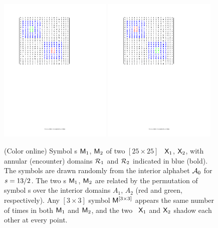 \documentclass[12pt]{iopart}
\begin{document}
\begin{figure}
\begin{center}
 \includegraphics[width=0.48\textwidth]{AKSs13TwoBlocksM1}
 \includegraphics[width=0.48\textwidth]{AKSs13TwoBlocksM2}
\end{center}
\caption[]{\label{fig:AKSs13TwoBlock}
(Color online)
Symbol \brick s $\mathsf{M}_1$, $\mathsf{M}_2$ of two $[25\times25]$ \twots\ $\mathsf{X}_1$,
$\mathsf{X}_2$, with
annular
(encounter) domains $\mathcal{R}_1$ and $\mathcal{R}_2$ indicated
in blue (bold).
The symbols are drawn randomly from the interior alphabet $\mathcal{A}_0$ for
$s=13/2$. The two \brick s $\mathsf{M}_1$, $\mathsf{M}_2$ are related by the permutation
of symbol \brick s over  the interior domains $A_1$, $A_2$ (red and green,
respectively). Any $[3\times3]$ symbol {\brick} $\mathsf{M}^{[3\times 3]}$
appears the same number of times in both $\mathsf{M}_1$ and $\mathsf{M}_2$, and the two
\twots\ $\mathsf{X}_1$ and $\mathsf{X}_2$ shadow each other at every point.
    }
\end{figure}
\end{document}
